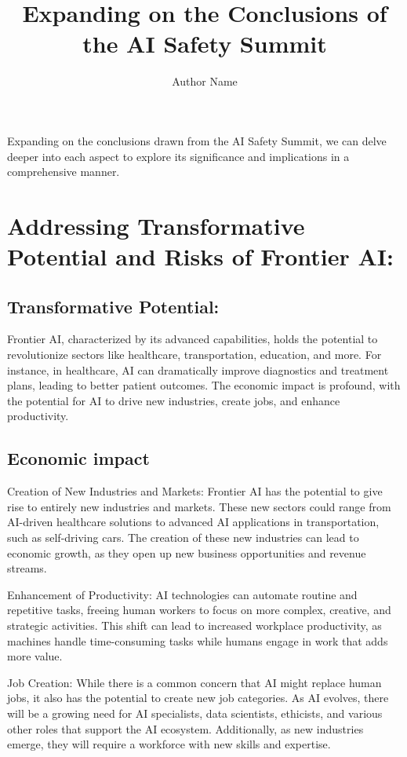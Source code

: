 \documentclass{article}
\title{Expanding on the Conclusions of the AI Safety Summit}
\author{Author Name}
\begin{document}
\maketitle

Expanding on the conclusions drawn from the AI Safety Summit, we can delve deeper into each aspect to explore its significance and implications in a comprehensive manner.

\section{Addressing Transformative Potential and Risks of Frontier AI:}
\subsection{Transformative Potential:}
Frontier AI, characterized by its advanced capabilities, holds the potential to revolutionize sectors like healthcare, transportation, education, and more. For instance, in healthcare, AI can dramatically improve diagnostics and treatment plans, leading to better patient outcomes. The economic impact is profound, with the potential for AI to drive new industries, create jobs, and enhance productivity.
\subsection{Economic impact}
Creation of New Industries and Markets: Frontier AI has the potential to give rise to entirely new industries and markets. These new sectors could range from AI-driven healthcare solutions to advanced AI applications in transportation, such as self-driving cars. The creation of these new industries can lead to economic growth, as they open up new business opportunities and revenue streams.

Enhancement of Productivity: AI technologies can automate routine and repetitive tasks, freeing human workers to focus on more complex, creative, and strategic activities. This shift can lead to increased workplace productivity, as machines handle time-consuming tasks while humans engage in work that adds more value.

Job Creation: While there is a common concern that AI might replace human jobs, it also has the potential to create new job categories. As AI evolves, there will be a growing need for AI specialists, data scientists, ethicists, and various other roles that support the AI ecosystem. Additionally, as new industries emerge, they will require a workforce with new skills and expertise.
\end{document}
